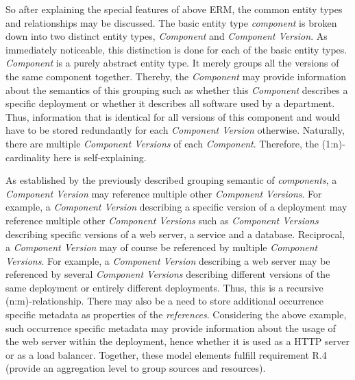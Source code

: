 So after explaining the special features of above ERM, the common entity types and relationships may be discussed. The basic entity type \emph{component} is broken down into two distinct entity types, \emph{Component} and \emph{Component Version}. As immediately noticeable, this distinction is done for each of the basic entity types. \emph{Component} is a purely abstract entity type. It merely groups all the versions of the same component together. Thereby, the \emph{Component} may provide information about the semantics of this grouping such as whether this \emph{Component} describes a specific deployment or whether it describes all software used by a department. Thus, information that is identical for all versions of this component and would have to be stored redundantly for each \emph{Component Version} otherwise. Naturally, there are multiple \emph{Component Versions} of each \emph{Component}. Therefore, the (1:n)-cardinality here is self-explaining.\par 
As established by the previously described grouping semantic of \emph{components}, a \emph{Component Version} may reference multiple other \emph{Component Versions}. For example, a \emph{Component Version} describing a specific version of a deployment may reference multiple other \emph{Component Versions} such as \emph{Component Versions} describing specific versions of a web server, a service and a database. Reciprocal, a \emph{Component Version} may of course be referenced by multiple \emph{Component Versions}. For example, a \emph{Component Version} describing a web server may be referenced by several \emph{Component Versions} describing different versions of the same deployment or entirely different deployments. Thus, this is a recursive (n:m)-relationship. There may also be a need to store additional occurrence specific metadata as properties of the \emph{references}. Considering the above example, such occurrence specific metadata may provide information about the usage of the web server within the deployment, hence whether it is used as a HTTP server or as a load balancer. Together, these model elements fulfill requirement R.4 (provide an aggregation level to group sources and resources).\par
